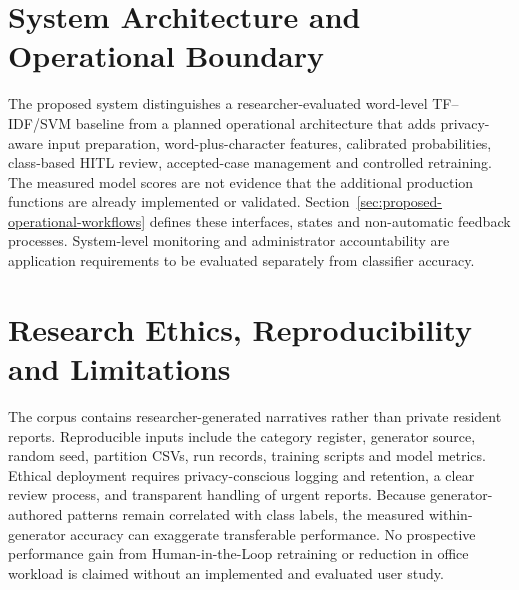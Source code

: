 \section{System Architecture and Operational Boundary}
The proposed system distinguishes a researcher-evaluated word-level TF--IDF/SVM baseline from a planned operational architecture that adds privacy-aware input preparation, word-plus-character features, calibrated probabilities, class-based HITL review, accepted-case management and controlled retraining. The measured model scores are not evidence that the additional production functions are already implemented or validated. Section~\ref{sec:proposed-operational-workflows} defines these interfaces, states and non-automatic feedback processes. System-level monitoring and administrator accountability are application requirements to be evaluated separately from classifier accuracy.



\section{Research Ethics, Reproducibility and Limitations}
The corpus contains researcher-generated narratives rather than private resident reports. Reproducible inputs include the category register, generator source, random seed, partition CSVs, run records, training scripts and model metrics. Ethical deployment requires privacy-conscious logging and retention, a clear review process, and transparent handling of urgent reports. Because generator-authored patterns remain correlated with class labels, the measured within-generator accuracy can exaggerate transferable performance. No prospective performance gain from Human-in-the-Loop retraining or reduction in office workload is claimed without an implemented and evaluated user study.
